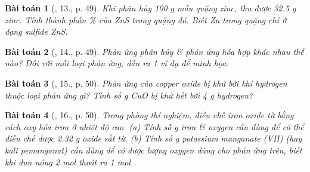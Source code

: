 \documentclass{article}
\newtheorem{baitoan}{Bài toán}
\begin{document}
\begin{baitoan}[\cite{An_Hoa_Hoc_nang_cao_8_9}, 13., p. 49]
	Khi phân hủy {\rm100 g} mẫu quặng zinc, thu được {\rm32.5 g} zinc. Tính thành phần {\rm\%} của {\rm ZnS} trong quặng đó. Biết {\rm Zn} trong quặng chỉ ở dạng sulfide {\rm ZnS}.
\end{baitoan}

\begin{baitoan}[\cite{An_Hoa_Hoc_nang_cao_8_9}, 14., p. 49]
	Phản ứng phân hủy \& phản ứng hóa hợp khác nhau thế nào? Đối với mỗi loại phản ứng, dẫn ra 1 ví dụ để minh họa.
\end{baitoan}

\begin{baitoan}[\cite{An_Hoa_Hoc_nang_cao_8_9}, 15., p. 50]
	Phản ứng của copper oxide bị khử bởi khí hydrogen thuộc loại phản ứng gì? Tính số {\rm g CuO} bị khử hết bởi {\rm4 g} hydrogen?
\end{baitoan}

\begin{baitoan}[\cite{An_Hoa_Hoc_nang_cao_8_9}, 16., p. 50]
	Trong phòng thí nghiệm, điều chế iron oxide từ {\rm{}} bằng cách oxy hóa iron ở nhiệt độ cao. (a) Tính số {\rm g} iron \& oxygen cần dùng để có thể điều chế được {\rm2.32 g} oxide sắt từ. (b) Tính số {\rm g} potassium manganate (VII) (hay kali pemanganat) {\rm{}} cần dùng để có được lượng oxygen dùng cho phản ứng trên, biết khi đun nóng {\rm2 mol } thoát ra {\rm1 mol }.
\end{baitoan}


\printbibliography[heading=bibintoc]
\end{document}
